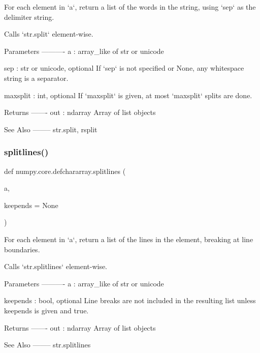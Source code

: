 \begin{DoxyVerb}For each element in `a`, return a list of the words in the
string, using `sep` as the delimiter string.

Calls `str.split` element-wise.

Parameters
----------
a : array_like of str or unicode

sep : str or unicode, optional
   If `sep` is not specified or None, any whitespace string is a
   separator.

maxsplit : int, optional
    If `maxsplit` is given, at most `maxsplit` splits are done.

Returns
-------
out : ndarray
    Array of list objects

See Also
--------
str.split, rsplit\end{DoxyVerb}
 \mbox{\label{namespacenumpy_1_1core_1_1defchararray_ab865acc98bccc2ddd4d8f9beab311e0a}} 
\subsubsection{\texorpdfstring{splitlines()}{splitlines()}}
{\footnotesize\ttfamily def numpy.\+core.\+defchararray.\+splitlines (\begin{DoxyParamCaption}\item[{}]{a,  }\item[{}]{keepends = {\ttfamily None} }\end{DoxyParamCaption})}

\begin{DoxyVerb}For each element in `a`, return a list of the lines in the
element, breaking at line boundaries.

Calls `str.splitlines` element-wise.

Parameters
----------
a : array_like of str or unicode

keepends : bool, optional
    Line breaks are not included in the resulting list unless
    keepends is given and true.

Returns
-------
out : ndarray
    Array of list objects

See Also
--------
str.splitlines\end{DoxyVerb}
 \mbox{\label{namespacenumpy_1_1core_1_1defchararray_aabfa1a91c6b9cdda53ba0255e5f2690d}} 
